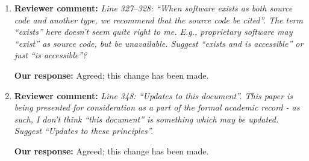 \documentclass{article}
\begin{document}
\begin{enumerate}
\item \textbf{Reviewer comment:}
\emph{Line 327--328: ``When software exists as both source code and another type, we recommend that the source code be cited''. The term ``exists'' here doesn't seem quite right to me. E.g., proprietary software may ``exist'' as source code, but be unavailable. Suggest ``exists and is accessible'' or just ``is accessible''?}

\textbf{Our response:}
Agreed; this change has been made.


\item \textbf{Reviewer comment:}
\emph{Line 348: ``Updates to this document''. This paper is being presented for consideration as a part of the formal academic record - as such, I don't think ``this document'' is something which may be updated. Suggest ``Updates to these principles''.}

\textbf{Our response:}
Agreed; this change has been made.

\end{enumerate}

%
%
\end{document}
